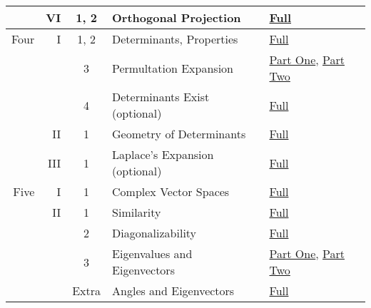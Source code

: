 \documentclass{article}
\begin{document}
\begin{center}
\begin{tabular}{|rrc|ll|}
      \cline{4-5}
      &VI  &1, 2 &Orthogonal Projection  &\href{https://youtu.be/AAjZJjByU3U}{Full}     \\
  \hline
 Four &I   &1, 2 &Determinants, Properties      &\href{https://youtu.be/BnyledMW6Ho}{Full}   \\
      &    &3 &Permultation Expansion             &\href{https://youtu.be/j1dYL2_Ud7E}{Part One}, \href{https://youtu.be/kWF2TzA0dU8}{Part Two}   \\
      &    &4 &Determinants Exist (optional)                 &\href{https://youtu.be/FMcTv4g7Goc}{Full}   \\
      \cline{4-5}
      &II  &1 &Geometry of Determinants           &\href{https://youtu.be/pAs6jAoiCog}{Full}   \\
      \cline{4-5}
      &III &1 &Laplace's Expansion (optional)     &\href{https://youtu.be/TyCM1Eu3OzQ}{Full}   \\
 \hline
 Five &I   &1 &Complex Vector Spaces              &\href{https://youtu.be/8uJSMFYUqs0}{Full}   \\
      \cline{4-5}
      &II  &1 &Similarity                         &\href{https://youtu.be/8uJSMFYUqs0}{Full}   \\
      &    &2 &Diagonalizability                  &\href{https://youtu.be/F0JBOCx07ws}{Full}   \\
      &    &3 &Eigenvalues and Eigenvectors       &\href{}{Part One}, \href{}{Part Two}   \\
      &    &Extra  &Angles and Eigenvectors       &\href{}{Full}   \\
 \hline
\end{tabular}
\end{center}
\end{document}
